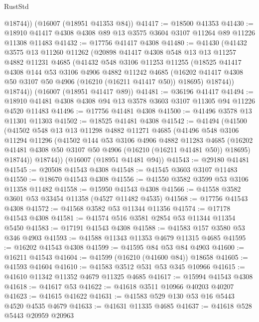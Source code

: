 \begin{lexlean}{RustStd}
\begin{coremodule}
        @18744))
    (@16007 (@18951 @41353 @84))
@41417 := @18500 @41353
@41430 := @18910 @41417 @4308 @4308 @89 @13 @3575 @3604 @3107 @11264 @89 @11226 @11308 @11483
@41432 := @17756 @41417 @4308
@41480 := @41430
    (@41432
      @3575
      @13
      @11260
      @11262
      (@20898
        @41417
        @4308
        @548
        @13
        @13
        @11257
        @4882
        @11231
        @4685
        (@41432
          @548
          @3106
          @11253
          @11255
          (@18525
            @41417
            @4308
            @144
            @53
            @3106
            @4906
            @4882
            @11242
            @4685
            (@16202 @41417 @4308 @50 @3107 @50 @4906 (@16210 (@16211 @41417 @50)) @18695)
            @18744))
        @18744))
    (@16007 (@18951 @41417 @89))
@41481 := @36196 @41417
@41494 := @18910 @41481 @4308 @4308 @94 @13 @3578 @3603 @3107 @11305 @94 @11226 @4520 @11483
@41496 := @17756 @41481 @4308
@41500 := @41496 @3578 @13 @11301 @11303
@41502 := @18525 @41481 @4308
@41542 := @41494
    (@41500
      (@41502
        @548
        @13
        @13
        @11298
        @4882
        @11271
        @4685
        (@41496
          @548
          @3106
          @11294
          @11296
          (@41502
            @144
            @53
            @3106
            @4906
            @4882
            @11283
            @4685
            (@16202 @41481 @4308 @50 @3107 @50 @4906 (@16210 (@16211 @41481 @50)) @18695)
            @18744))
        @18744))
    (@16007 (@18951 @41481 @94))
@41543 := @29180 @41481
@41545 := @20508 @41543 @4308
@41548 := @41545 @3603 @3107 @11483
@41550 := @18670 @41543 @4308
@41556 := @41550 @3582 @3599 @53 @3106 @11358 @11482
@41558 := @15950 @41543 @4308
@41566 := @41558 @3582 @3601 @53 @33454 @11358 (@4527 @11482 @4535)
@41568 := @17756 @41543 @4308
@41572 := @41568 @3582 @53 @11344 @11356
@41574 := @17178 @41543 @4308
@41581 := @41574 @516 @3581 @2854 @53 @11344 @11354 @5450
@41583 := @17191 @41543 @4308
@41588 := @41583 @157 @3580 @53 @346 @4903
@41593 := @41588 @11343 @11353 @4679 @11315 @4685
@41595 := @16202 @41543 @4308
@41599 := @41595 @84 @53 @84 @4903
@41600 := @16211 @41543
@41604 := @41599 (@16210 (@41600 @84)) @18658
@41605 := @41593 @41604
@41610 := @41583 @3512 @531 @53 @345 @10966
@41615 := @41610 @11342 @11352 @4679 @11325 @4685
@41617 := @15994 @41543 @4308
@41618 := @41617 @53
@41622 := @41618 @3511 @10966 @40203 @40207
@41623 := @41615 @41622
@41631 := @41583 @529 @130 @53 @16 @5443 @4520 @4535 @4679
@41633 := @41631 @11335 @4685
@41637 := @41618 @528 @5443 @20959 @20963

\end{coremodule}
\end{lexlean}
